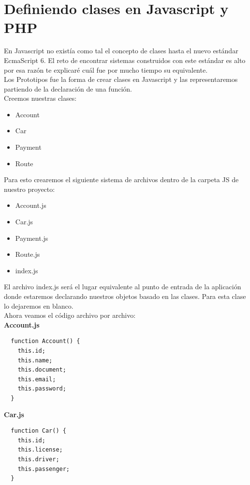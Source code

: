 \documentclass{article}
\begin{document}
\section{Definiendo clases en Javascript y PHP}%
En Javascript no existía como tal el concepto de clases hasta el nuevo estándar
EcmaScript 6. El reto de encontrar sistemas construidos con este estándar es
alto por esa razón te explicaré cuál fue por mucho tiempo su equivalente.\\

Los Prototipos fue la forma de crear clases en Javascript y las representaremos
partiendo de la declaración de una función.\\

Creemos nuestras clases:
\begin{itemize}
  \item Account
  \item Car
  \item Payment
  \item Route
\end{itemize}

Para esto crearemos el siguiente sistema de archivos dentro de la carpeta JS de
nuestro proyecto:

\begin{itemize}
  \item Account.js
  \item Car.js
  \item Payment.js
  \item Route.js
  \item index.js
\end{itemize}

El archivo index.js será el lugar equivalente al punto de entrada de la
aplicación donde estaremos declarando nuestros objetos basado en las clases.
Para esta clase lo dejaremos en blanco.\\

Ahora veamos el código archivo por archivo:\\

\textbf{Account.js}
\begin{verbatim}
  function Account() {
    this.id;
    this.name;
    this.document;
    this.email;
    this.password;
  }
\end{verbatim}

\textbf{Car.js}
\begin{verbatim}
  function Car() {
    this.id;
    this.license;
    this.driver;
    this.passenger;
  }
\end{verbatim}
\end{document}

